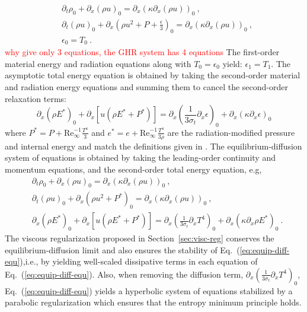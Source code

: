 \documentclass[review]{elsarticle}
\newcommand{\eqt}[1]{Eq.~(\ref{#1})}                     %
\newcommand{\sect}[1]{Section~\ref{#1}}                     %
\renewcommand{\Re}{\textrm{Re}}
\newcommand{\tcr}[1]{\textcolor{red}{#1}}
\begin{document}
%
\begin{align}\label{eq:first-order}
&\partial_t \rho_0 + \partial_x \left( \rho u \right)_0 = \partial_x \left( \kappa \partial_x \left( \rho u \right)\right)_0 \nonumber \ ,\\
&\partial_t \left( \rho u \right)_0 + \partial_x \left( \rho u^2 + P + \frac{\epsilon}{3}\right)_0 = \partial_x \left( \kappa \partial_x \left( \rho u \right) \right)_0  \ , \\
&\epsilon_0 = T_0 \nonumber \ .
\end{align}
%
\tcr{why give only 3 equations, the GHR system has 4 equations}
%
The first-order material energy and radiation equations along with $T_0 = \epsilon_0$ yield: $\epsilon_1 = T_1$. The asymptotic total energy equation is obtained by taking the second-order material and radiation energy equations and summing them to cancel the second-order relaxation terms:
%
\begin{equation}
\partial_x \left( \rho E^* \right)_0 + \partial_x \left[ u \left( \rho E^* + P^* \right) \right] = \partial_x \left( \frac{1}{3 \sigma_t} \partial_x \epsilon \right)_0 + \partial_x \left( \kappa \partial_x \epsilon \right)_0 \nonumber
\end{equation}
%
where $P^* = P + \Re_\infty^{-1} \frac{T^4}{3}$ and $e^* = e + \Re_\infty^{-1} \frac{T^4}{3 \rho}$ are the radiation-modified pressure and internal energy and match the definitions given in \cite{LowrieMorel}. The equilibrium-diffusion system of equations is obtained by taking the leading-order continuity and momentum equations, and the second-order total energy equation, e.g,
%
\begin{align}\label{eq:equip-diff-equ}
&\partial_t \rho_0 + \partial_x \left( \rho u \right)_0 = \partial_x \left( \kappa \partial_x \left( \rho u \right)\right)_0 \nonumber \ ,\\
&\partial_t \left( \rho u \right)_0 + \partial_x \left( \rho u^2 + P^* \right)_0 = \partial_x \left( \kappa \partial_x \left( \rho u \right) \right)_0  \ , \\
&\partial_x \left( \rho E^* \right)_0 + \partial_x \left[ u \left( \rho E^* + P^* \right) \right] = \partial_x \left( \frac{1}{3 \sigma_t} \partial_x T^4 \right)_0 + \partial_x \left( \kappa \partial_x \rho E^* \right)_0 \ . \nonumber
\end{align}
%
The viscous regularization proposed in \sect{sec:visc-reg} conserves the equilibrium-diffusion limit and also ensures the stability of \eqt{eq:equip-diff-equ},i.e., by yielding well-scaled dissipative terms in each equation of \eqt{eq:equip-diff-equ}. Also, when removing the diffusion term, $\partial_x \left( \frac{1}{3 \sigma_t} \partial_x T^4 \right)_0$, \eqt{eq:equip-diff-equ} yields a hyperbolic system of equations stabilized by a parabolic regularization \cite{Parabolic} which ensures that the entropy minimum principle holds. 
\end{document}
